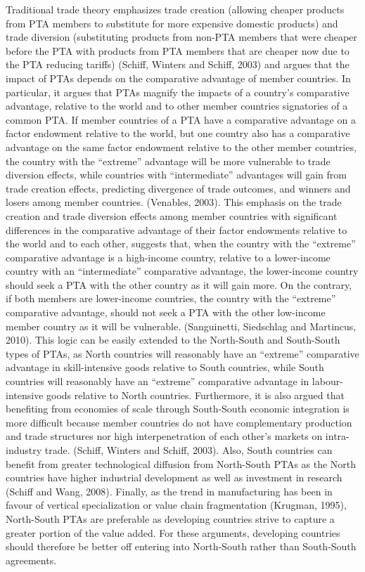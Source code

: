 \documentclass{article}%
\begin{document}
Traditional trade theory emphasizes trade creation (allowing cheaper
products from PTA members to substitute for more expensive domestic
products) and trade diversion (substituting products from non-PTA
members that were cheaper before the PTA with products from PTA members
that are cheaper now due to the PTA reducing tariffs) (Schiff, Winters
and Schiff, 2003) and argues that the impact of PTAs depends on the
comparative advantage of member countries. In particular, it argues that
PTAs magnify the impacts of a country's comparative advantage, relative
to the world and to other member countries signatories of a common PTA.
If member countries of a PTA have a comparative advantage on a factor
endowment relative to the world, but one country also has a comparative
advantage on the same factor endowment relative to the other member
countries, the country with the ``extreme'' advantage will be more
vulnerable to trade diversion effects, while countries with
``intermediate'' advantages will gain from trade creation effects,
predicting divergence of trade outcomes, and winners and losers among
member countries. (Venables, 2003). This emphasis on the trade creation
and trade diversion effects among member countries with significant
differences in the comparative advantage of their factor endowments
relative to the world and to each other, suggests that, when the country
with the ``extreme'' comparative advantage is a high-income country,
relative to a lower-income country with an ``intermediate'' comparative
advantage, the lower-income country should seek a PTA with the other
country as it will gain more. On the contrary, if both members are
lower-income countries, the country with the ``extreme'' comparative
advantage, should not seek a PTA with the other low-income member
country as it will be vulnerable. (Sanguinetti, Siedschlag and
Martincus, 2010). This logic can be easily extended to the North-South
and South-South types of PTAs, as North countries will reasonably have
an ``extreme'' comparative advantage in skill-intensive goods relative
to South countries, while South countries will reasonably have an
``extreme'' comparative advantage in labour-intensive goods relative to
North countries. Furthermore, it is also argued that benefiting from
economies of scale through South-South economic integration is more
difficult because member countries do not have complementary production
and trade structures nor high interpenetration of each other's markets
on intra-industry trade. (Schiff, Winters and Schiff, 2003). Also, South
countries can benefit from greater technological diffusion from
North-South PTAs as the North countries have higher industrial
development as well as investment in research (Schiff and Wang, 2008).
Finally, as the trend in manufacturing has been in favour of vertical
specialization or value chain fragmentation (Krugman, 1995), North-South
PTAs are preferable as developing countries strive to capture a greater
portion of the value added. For these arguments, developing countries
should therefore be better off entering into North-South rather than
South-South agreements.
\end{document}
